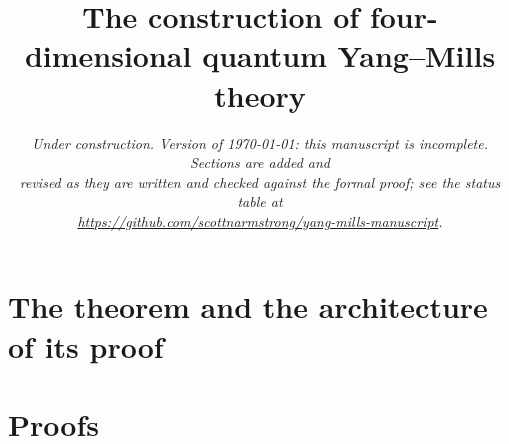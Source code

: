 \documentclass[11pt,letterpaper]{article}
\date{\small\itshape Under construction. Version of \today: this manuscript is incomplete. Sections are added and\\ revised as they are written and checked against the formal proof; see the status table at\\ \url{https://github.com/scottnarmstrong/yang-mills-manuscript}.}
\title{The construction of four-dimensional quantum Yang--Mills theory}
\author{}
\numberwithin{equation}{section}
\theoremstyle{plain}
\theoremstyle{definition}
\theoremstyle{remark}
\begin{document}
\maketitle
\begin{abstract}
\end{abstract}
\tableofcontents
\clearpage

\part{The theorem and the architecture of its proof}







\part{Proofs}














\end{document}
